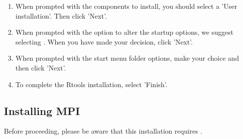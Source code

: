 \begin{enumerate}
  \item When prompted with the components to install, you should select a 'User installation'.  Then click 'Next'.
  \item When prompted with the option to alter the startup options, we suggest selecting .  When you have made your decision, click 'Next'.
  \item When prompted with the start menu folder options, make your choice and then click 'Next'.
  \item To complete the Rtools installation, select 'Finish'.
\end{enumerate}





\subsection{Installing MPI}
Before proceeding, please be aware that this installation requires {\color{red}{administrative privileges}}.

